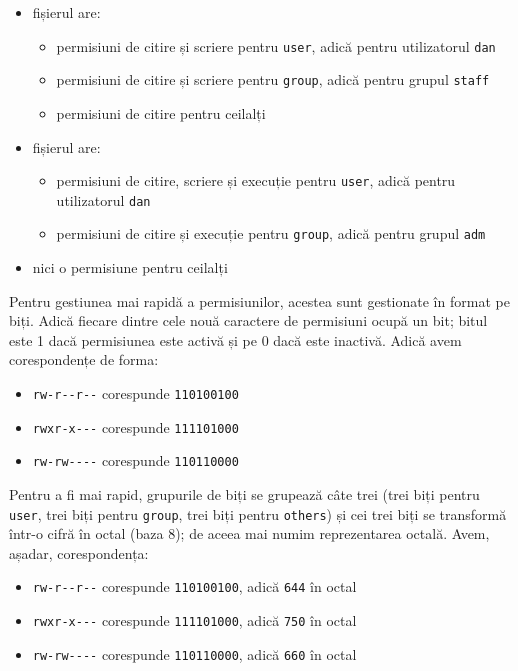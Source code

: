 \begin{itemize}
  \item fișierul  are:
    \begin{itemize}
      \item permisiuni de citire și scriere pentru \texttt{user}, adică pentru
                  utilizatorul \texttt{dan}
      \item permisiuni de citire și scriere pentru \texttt{group}, adică pentru
                  grupul \texttt{staff}
      \item permisiuni de citire pentru ceilalți
    \end{itemize}
  \item fișierul  are:
    \begin{itemize}
      \item permisiuni de citire, scriere și execuție pentru \texttt{user},
                  adică pentru utilizatorul \texttt{dan}
      \item permisiuni de citire și execuție pentru \texttt{group}, adică
                  pentru grupul \texttt{adm}
    \end{itemize}
  \item nici o permisiune pentru ceilalți
\end{itemize}

Pentru gestiunea mai rapidă a permisiunilor, acestea sunt gestionate în format pe
biți. Adică fiecare dintre cele nouă caractere de permisiuni ocupă un bit; bitul
este 1 dacă permisiunea este activă și pe 0 dacă este inactivă. Adică avem
corespondențe de forma:

\begin{itemize}
  \item \texttt{rw-r-{}-r-{}-} corespunde \texttt{110100100}
  \item \texttt{rwxr-x-{}-{}-} corespunde \texttt{111101000}
  \item \texttt{rw-rw-{}-{}-{}-} corespunde \texttt{110110000}
\end{itemize}

Pentru a fi mai rapid, grupurile de biți se grupează câte trei (trei biți pentru \texttt{user},
trei biți pentru \texttt{group}, trei biți pentru \texttt{others}) și cei trei biți se transformă într-o
cifră în octal (baza 8); de aceea mai numim reprezentarea octală. Avem, așadar,
corespondența:

\begin{itemize}
  \item \texttt{rw-r-{}-r-{}-} corespunde \texttt{110100100}, adică \texttt{644} în octal
  \item \texttt{rwxr-x-{}-{}-} corespunde \texttt{111101000}, adică \texttt{750} în octal
  \item \texttt{rw-rw-{}-{}-{}-} corespunde \texttt{110110000}, adică \texttt{660} în octal
\end{itemize}

